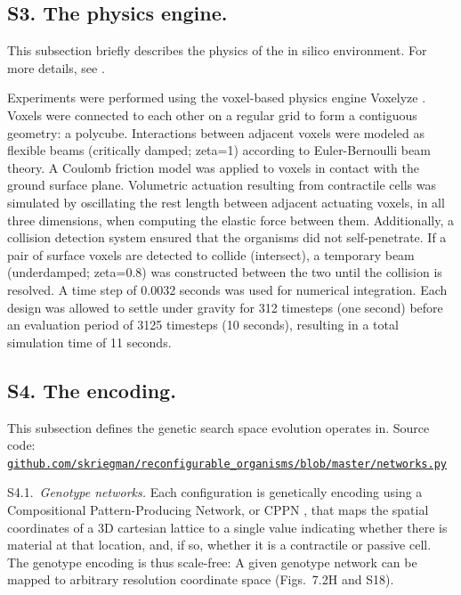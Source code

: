 \subsection*{S3. The physics engine.}

This subsection briefly describes the physics of the in silico environment. 
For more details, see \cite{hiller2014dynamic}.

Experiments were performed using the voxel-based physics engine Voxelyze \cite{hiller2014dynamic}. 
Voxels were connected to each other on a regular grid to form a contiguous geometry: a polycube. 
Interactions between adjacent voxels were modeled as flexible beams (critically damped; zeta=1) according to Euler-Bernoulli beam theory. 
A Coulomb friction model was applied to voxels in contact with the ground surface plane. 
Volumetric actuation resulting from contractile cells was simulated by oscillating the rest length between adjacent actuating voxels, in all three dimensions, when computing the elastic force between them.
Additionally, a collision detection system ensured that the organisms did not self-penetrate. 
If a pair of surface voxels are detected to collide (intersect), a temporary beam (underdamped; zeta=0.8) was constructed between the two until the collision is resolved. 
A time step of 0.0032 seconds was used for numerical integration. Each design was allowed to settle under gravity for 312 timesteps (one second) before an evaluation period of 3125 timesteps (10 seconds), resulting in a total simulation time of 11 seconds.


\subsection*{S4. The encoding.}

This subsection defines the genetic search space evolution operates in. Source code:
\href{https://github.com/skriegman/reconfigurable_organisms/blob/master/networks.py}{\footnotesize\tt\color{blue}github.com/skriegman/reconfigurable\_organisms/blob/master/networks.py}

\vspace{1em} 

S4.1.~\textit{Genotype networks.}
Each configuration is genetically encoding using a Compositional Pattern-Producing Network, or CPPN \cite{stanley2007compositional}, that maps the spatial coordinates of a 3D cartesian lattice to a single value indicating whether there is material at that location, and, if so, whether it is a contractile or passive cell. 
The genotype encoding is thus scale-free: A given genotype network can be mapped to arbitrary resolution coordinate space (Figs.~7.2H and S18). 

